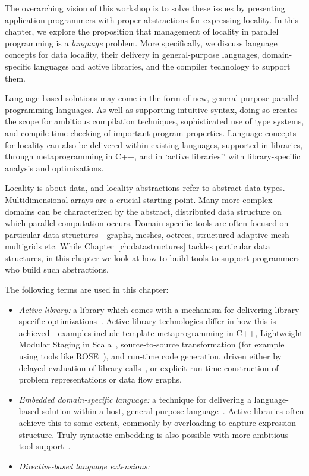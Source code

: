 The overarching vision of this workshop is to solve these issues by presenting application programmers with proper abstractions for expressing locality. In this chapter, we explore the proposition that management of locality in parallel programming is a \emph{language} problem. More specifically, we discuss language concepts for data locality, their delivery in general-purpose languages, domain-specific languages and active libraries, and the compiler technology to support them. 
 
Language-based solutions may come in the form of new, general-purpose parallel
programming languages.  As well as supporting intuitive syntax, doing so creates the scope for ambitious compilation techniques, sophisticated use of type systems, and compile-time checking of important program properties. Language concepts for locality can also be delivered within existing languages, supported in libraries, through metaprogramming in C++, and in `active libraries'' with library-specific analysis and optimizations.
 

Locality is about data, and locality abstractions refer to abstract data types. Multidimensional arrays are a crucial starting point.  Many more complex domains can be characterized by the abstract, distributed data structure on which parallel computation occurs. Domain-specific tools are often focused on particular data structures - graphs, meshes, octrees, structured adaptive-mesh multigrids etc.  While Chapter~\ref{ch:datastructures} tackles particular data structures, in this chapter we look at how to build tools to support programmers who build such abstractions.

The following terms are used in this chapter:

\begin{itemize}
\item \emph{Active library:} a library which comes with a mechanism for delivering library-specific optimizations~\cite{DBLP:journals/corr/math-NA-9810022}.  Active library technologies differ in how this is achieved - examples include template metaprogramming in C++, Lightweight Modular Staging in Scala~\cite{DBLP:journals/cacm/RompfO12}, source-to-source transformation (for example using tools like ROSE~\cite{DBLP:conf/lcpc/YiQ04}), and run-time code generation, driven either by delayed evaluation of library calls~\cite{DBLP:journals/scp/RussellMKB11}, or explicit run-time construction of problem representations or data flow graphs.
\item \emph{Embedded domain-specific language:} a technique for delivering a language-based solution within a host, general-purpose language~\cite{Hudak96buildingdomain-specific}.  Active libraries often achieve this to some extent, commonly by overloading to capture expression structure.  Truly syntactic embedding is also possible with more ambitious tool support~\cite{Erdweg:2011:SLS:2076021.2048099}.
\item \emph{Directive-based language extensions:}
\end{itemize}

